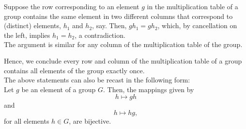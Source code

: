 \begin{xca}
Suppose the row corresponding to an element $g$ in the multiplication table of
a group contains the same element in two different columns that correspond to
(distinct) elements, $h_1$ and $h_2$, say. Then, $g h_1 = g h_2$, which, by
cancellation on the left, implies $h_1 = h_2$, a contradiction. \\
The argument is similar for any column of the multiplication table of the group.

Hence, we conclude every row and column of the multiplication table of a group
contains all elements of the group exactly once. \\

The above statements can also be recast in the following form: \\
Let $g$ be an element of a group $G$. Then, the mappings given by \[ h \mapsto
gh \] and \[ h \mapsto hg, \] for all elements $h \in G$, are bijective.
\end{xca}

